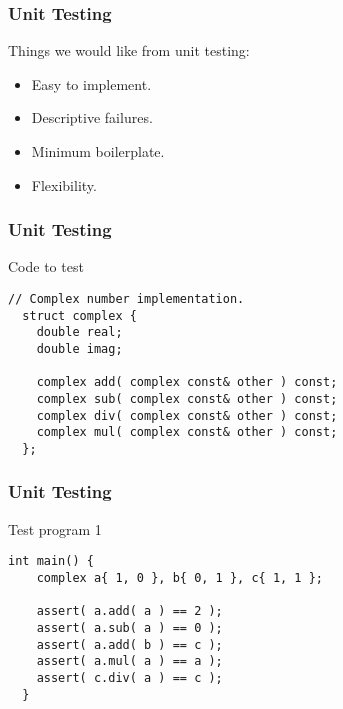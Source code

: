 \begin{frame}
  \frametitle{Unit Testing}
  Things we would like from unit testing:
  \begin{itemize}
  \vspace{0.5cm}
  \item Easy to implement.
  \vspace{0.5cm}
  \item Descriptive failures.
  \vspace{0.5cm}
  \item Minimum boilerplate.
  \vspace{0.5cm}
  \item Flexibility.
  \end{itemize}
\end{frame}

\begin{frame}[fragile]
  \frametitle{Unit Testing}
  \begin{block}{Code to test}
    \begin{lstlisting}[style=C]
  // Complex number implementation.
  struct complex {
    double real;
    double imag;

    complex add( complex const& other ) const;
    complex sub( complex const& other ) const;
    complex div( complex const& other ) const;
    complex mul( complex const& other ) const;
  };
    \end{lstlisting}
  \end{block}
\end{frame}

\begin{frame}[fragile]
  \frametitle{Unit Testing}
  \begin{block}{Test program 1}
    \begin{lstlisting}[style=C]
  int main() {
    complex a{ 1, 0 }, b{ 0, 1 }, c{ 1, 1 };

    assert( a.add( a ) == 2 );
    assert( a.sub( a ) == 0 );
    assert( a.add( b ) == c );
    assert( a.mul( a ) == a );
    assert( c.div( a ) == c );
  }
    \end{lstlisting}
  \end{block}
\end{frame}

